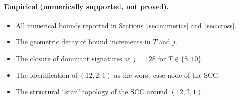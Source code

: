 \documentclass[11pt,a4paper]{article}
\theoremstyle{definition}
\begin{document}
\paragraph{Empirical (numerically supported, not proved).}
\begin{itemize}
  \item All numerical bounds reported in
        Sections~\ref{sec:numerics} and~\ref{sec:cross}.
  \item The geometric decay of bound increments in $T$ and $j$.
  \item The closure of dominant signatures at $j = 128$ for
        $T \in \{8, 10\}$.
  \item The identification of $(12, 2, 1)$ as the worst-case node
        of the SCC.
  \item The structural ``star'' topology of the SCC around
        $(12, 2, 1)$.
\end{itemize}
\end{document}
